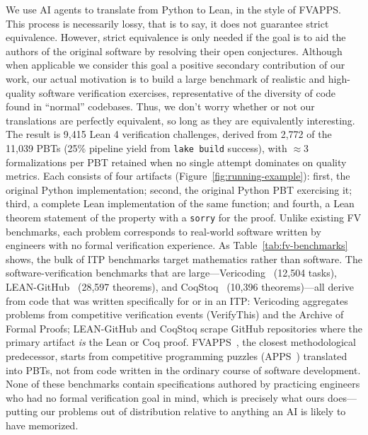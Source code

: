 We use AI agents to translate from Python to Lean, in the style of FVAPPS.
This process is necessarily lossy, that is to say, it does not guarantee strict equivalence.
However, strict equivalence is only needed if the goal is to aid the authors of the original
software by resolving their open conjectures.
Although when applicable we consider this goal a positive secondary contribution of our work,
our actual motivation is to build a large benchmark of realistic and high-quality
software verification exercises, representative of the diversity of code found in 
``normal'' codebases.
Thus, we don't worry whether or not our translations are perfectly equivalent, so long as they are equivalently interesting.
The result is 9{,}415 Lean 4 verification challenges, derived from 2{,}772 of the 11{,}039 PBTs (25\% pipeline yield from \texttt{lake build} success), with $\approx$3 formalizations per PBT retained when no single attempt dominates on quality metrics. Each consists of four artifacts (Figure~\ref{fig:running-example}): first, the original Python implementation; second, the original Python PBT exercising it; third, a complete Lean implementation of the same function; and fourth, a Lean theorem statement of the property with a \texttt{sorry} for the proof. Unlike existing FV benchmarks, each problem corresponds to real-world software written by engineers with no formal verification experience. As Table~\ref{tab:fv-benchmarks} shows, the bulk of ITP benchmarks target mathematics rather than software. The software-verification benchmarks that are large---Vericoding~\cite{bursuc2025benchmark} (12{,}504 tasks), LEAN-GitHub~\cite{wu2024lean} (28{,}597 theorems), and CoqStoq~\cite{thompson2024rango} (10{,}396 theorems)---all derive from code that was written specifically for or in an ITP: Vericoding aggregates problems from competitive verification events (VerifyThis) and the Archive of Formal Proofs; LEAN-GitHub and CoqStoq scrape GitHub repositories where the primary artifact \emph{is} the Lean or Coq proof. FVAPPS~\cite{dougherty2025proving}, the closest methodological predecessor, starts from competitive programming puzzles (APPS~\cite{hendrycks2021apps}) translated into PBTs, not from code written in the ordinary course of software development. None of these benchmarks contain specifications authored by practicing engineers who had no formal verification goal in mind, which is precisely what ours does---putting our problems out of distribution relative to anything an AI is likely to have memorized.



